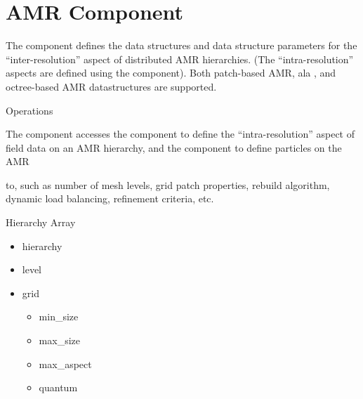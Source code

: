 \section{AMR Component} \label{s:component-amr}

The  component defines the data structures and data
structure parameters for the ``inter-resolution'' aspect of
distributed AMR hierarchies.  (The ``intra-resolution'' aspects are
defined using the  component).  Both patch-based AMR, ala
\enzo, and octree-based AMR datastructures are supported.

Operations

The  component accesses the  component to define
the ``intra-resolution'' aspect of field data on an AMR hierarchy, and
the
 component to define particles on the AMR

to, such as number of mesh
levels, grid patch properties, rebuild algorithm, dynamic load
balancing, refinement criteria, etc.

Hierarchy
Array


\begin{itemize}
\item hierarchy
\item level
\item grid
\begin{itemize}
\item min\_size
\item max\_size
\item max\_aspect
\item quantum
\end{itemize}
\end{itemize}

